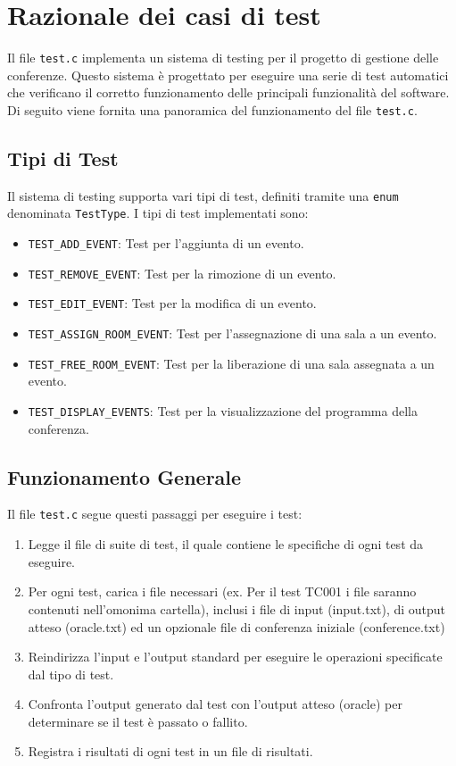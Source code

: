 \documentclass[11pt]{scrartcl} %
\begin{document}
\section{Razionale dei casi di test}
Il file \texttt{test.c} implementa un sistema di testing per il progetto di gestione delle conferenze. Questo sistema è progettato per eseguire una serie di test automatici che verificano il corretto funzionamento delle principali funzionalità del software. Di seguito viene fornita una panoramica del funzionamento del file \texttt{test.c}.

\subsection{Tipi di Test}
Il sistema di testing supporta vari tipi di test, definiti tramite una \texttt{enum} denominata \texttt{TestType}. I tipi di test implementati sono:
\begin{itemize}
	\item \texttt{TEST\_ADD\_EVENT}: Test per l'aggiunta di un evento.
	\item \texttt{TEST\_REMOVE\_EVENT}: Test per la rimozione di un evento.
	\item \texttt{TEST\_EDIT\_EVENT}: Test per la modifica di un evento.
	\item \texttt{TEST\_ASSIGN\_ROOM\_EVENT}: Test per l'assegnazione di una sala a un evento.
	\item \texttt{TEST\_FREE\_ROOM\_EVENT}: Test per la liberazione di una sala assegnata a un evento.
	\item \texttt{TEST\_DISPLAY\_EVENTS}: Test per la visualizzazione del programma della conferenza.
\end{itemize}

\subsection{Funzionamento Generale}
Il file \texttt{test.c} segue questi passaggi per eseguire i test:
\begin{enumerate}
	\item Legge il file di suite di test, il quale contiene le specifiche di ogni test da eseguire.
	\item Per ogni test, carica i file necessari (ex. Per il test TC001 i file saranno contenuti nell'omonima cartella), inclusi i file di input (input.txt), di output atteso (oracle.txt) ed un opzionale file di conferenza iniziale (conference.txt)
	\item Reindirizza l'input e l'output standard per eseguire le operazioni specificate dal tipo di test.
	\item Confronta l'output generato dal test con l'output atteso (oracle) per determinare se il test è passato o fallito.
	\item Registra i risultati di ogni test in un file di risultati.
\end{enumerate}
\end{document}

